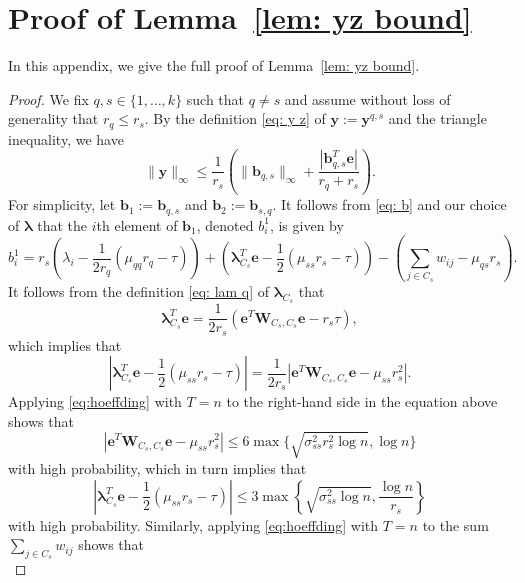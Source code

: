 \documentclass[twoside,11pt]{article}
\renewcommand{\b}{{\bs{b}}}
\newcommand{\e}{\bs {e}}
\newcommand{\bs}{\boldsymbol}
\newcommand{\W}{\bs {W}}
\newcommand{\0}{\bs{0}}
\newcommand{\bra}[1]{\ensuremath{\left\{ #1 \right\}}} %
\begin{document}
{\section{Proof of Lemma~\ref{lem: yz bound}}
\label{app: yz}
In this appendix, we give the full proof of Lemma~\ref{lem: yz bound}.
\begin{proof}
We fix $q,s \in \{1,\dots,k\}$ such that $q \neq s$ and assume without loss of generality that $r_q \leq r_s$.
By the definition \eqref{eq: y z} of $\bs{y} := \bs{y}^{q,s}$ and the triangle inequality, we have
\begin{equation}
\label{eq:y_inf}
	\|\bs{y}\|_{\infty} \leq \frac{1}{r_s}\left( \|\bs{b}_{q,s}\|_{\infty} + \frac{|\bs{b}_{q,s}^T \bs{e}|}{r_q +r_s}\right).
\end{equation}
For simplicity, let \(\b_1:= \b_{q,s}\) and \(\b_2 := \b_{s,q}\).
It follows from \eqref{eq: b} and our choice of $\bs{\lambda}$  that the $i$th element of $\bs{b}_1$, denoted $b_i^1$, is given by
$$
	b_i^1 = r_s \left( \lambda_i -\frac{1}{2r_q}(\mu_{qq} r_q - \tau) \right) + \left(\bs{\lambda}_{C_s}^T\bs{e} - \frac{1}{2}(\mu_{ss} r_s - \tau) \right) - \left( \sum_{j \in C_s} w_{ij} - \mu_{qs} r_s \right).
$$
It follows from the definition \eqref{eq: lam q} of $\bs{\lambda}_{C_s}$  that
$$
	\bs{\lambda}_{C_s}^T\bs{e} = \frac{1}{2 r_s}\left(\bs{e}^T\bs{W}_{C_s,C_s}\bs{e} - r_s \tau \right),
$$
which implies that
$$
	\left| \bs{\lambda}_{C_s}^T\bs{e} - \frac{1}{2}(\mu_{ss} r_s - \tau)  \right| = \frac{1}{2r_s}\left|\bs{e}^T\bs{W}_{C_s,C_s}\bs{e}-\mu_{ss} r_s^2 \right|.
$$
Applying \eqref{eq:hoeffding} with $T = n$ to the right-hand side in the equation above shows that
\begin{equation} \label{cluster sum}
	|\e^T \W_{C_s, C_s} \e - \mu_{ss} r_s^2 |
	 \le 6 \max \{ \sqrt{\sigma_{ss}^2 r_s^2 \log n}, \log n \}
\end{equation}
with high probability,
which in turn implies that
\begin{equation} \label{lam sum}
	\left| \bs{\lambda}_{C_s}^T\bs{e} - \frac{1}{2}(\mu_{ss} r_s - \tau)
	\right| \le 3 \max\bra{ \sqrt{\sigma_{ss}^2  \log n}, \frac{\log n}{r_s} }
\end{equation}
with high probability.
Similarly, applying \eqref{eq:hoeffding} with $T=n$ to the sum $\sum_{j\in C_s} w_{ij}$ shows that
\begin{equation} \label{out sum}

\end{equation}
\end{proof}}
\end{document}
